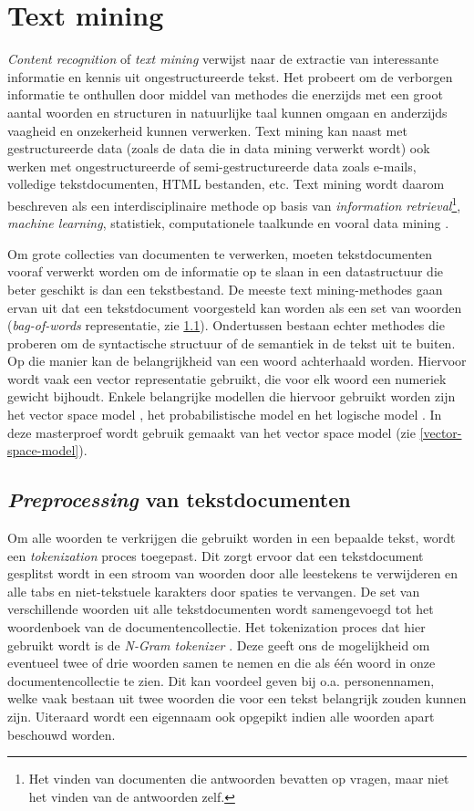 \section{Text mining}\label{text-mining}
\textit{Content recognition} of \textit{text mining} verwijst naar de extractie van interessante informatie en kennis uit ongestructureerde tekst. Het probeert om de verborgen informatie te onthullen door middel van methodes die enerzijds met een groot aantal woorden en structuren in natuurlijke taal kunnen omgaan en anderzijds vaagheid en onzekerheid kunnen verwerken. Text mining kan naast met gestructureerde data (zoals de data die in data mining verwerkt wordt) ook werken met ongestructureerde of semi-gestructureerde data zoals e-mails, volledige tekstdocumenten, HTML bestanden, etc. Text mining wordt daarom beschreven als een interdisciplinaire methode op basis van \textit{information retrieval}\footnote{Het vinden van documenten die antwoorden bevatten op vragen, maar niet het vinden van de antwoorden zelf.},\textit{ machine learning}, statistiek, computationele taalkunde en vooral data mining  \cite{Hotho2005}. 

Om grote collecties van documenten te verwerken, moeten tekstdocumenten vooraf verwerkt worden om de informatie op te slaan in een datastructuur die beter geschikt is dan een tekstbestand. De meeste text mining-methodes gaan ervan uit dat een tekstdocument voorgesteld kan worden als een set van woorden (\textit{bag-of-words} representatie, zie \ref{bag-of-words}). Ondertussen bestaan echter methodes die proberen om de syntactische structuur of de semantiek in de tekst uit te buiten. Op die manier kan de belangrijkheid van een woord achterhaald worden. Hiervoor wordt vaak een vector representatie gebruikt, die voor elk woord een numeriek gewicht bijhoudt. Enkele belangrijke modellen die hiervoor gebruikt worden zijn het vector space model \cite{Salton1975}, het probabilistische model \cite{ROBERTSON1977} en het logische model \cite{Rigsbergen1986}. In deze masterproef wordt gebruik gemaakt van het vector space model (zie \ref{vector-space-model}).


\subsection{\textit{Preprocessing} van tekstdocumenten}\label{bag-of-words}
Om alle woorden te verkrijgen die gebruikt worden in een bepaalde tekst, wordt een \textit{tokenization}\label{tokenization} proces toegepast. Dit zorgt ervoor dat een tekstdocument gesplitst wordt in een stroom van woorden door alle leestekens te verwijderen en alle tabs en niet-tekstuele karakters door spaties te vervangen. De set van verschillende woorden uit alle tekstdocumenten wordt samengevoegd tot het woordenboek van de documentencollectie. Het tokenization proces dat hier gebruikt wordt is de \textit{N-Gram tokenizer} \cite{McNamee2004}. Deze geeft ons de mogelijkheid om eventueel twee of drie woorden samen te nemen en die als \'e\'en woord in onze documentencollectie te zien. Dit kan voordeel geven bij o.a. personennamen, welke vaak bestaan uit twee woorden die voor een tekst belangrijk zouden kunnen zijn. Uiteraard wordt een eigennaam ook opgepikt indien alle woorden apart beschouwd worden.

